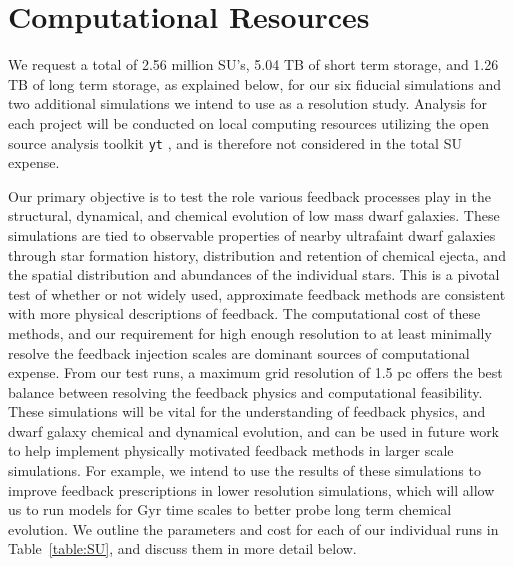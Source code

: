 \documentclass[11pt]{article}
\begin{document}
\section{Computational Resources}
We request a total of 2.56 million SU's, 5.04 TB of short term storage, and 1.26 TB of long term storage, as explained below, for our six fiducial simulations and two additional simulations we intend to use as a resolution study. Analysis for each project will be conducted on local computing resources utilizing the open source analysis toolkit \texttt{yt} \citep{yt}, and is therefore not considered in the total SU expense.

Our primary objective is to test the role various feedback processes play in the structural, dynamical, and chemical evolution of low mass dwarf galaxies. These simulations are tied to observable properties of nearby ultrafaint dwarf galaxies through star formation history, distribution and retention of chemical ejecta, and the spatial distribution and abundances of the individual stars. This is a pivotal test of whether or not widely used, approximate feedback methods are consistent with more physical descriptions of feedback. The computational cost of these methods, and our requirement for high enough resolution to at least minimally resolve the feedback injection scales are dominant sources of computational expense. From our test runs, a maximum grid resolution of 1.5 pc offers the best balance between resolving the feedback physics and computational feasibility. These simulations will be vital for the understanding of feedback physics, and dwarf galaxy chemical and dynamical evolution, and can be used in future work to help implement physically motivated feedback methods in larger scale simulations. For example, we intend to use the results of these simulations to improve feedback prescriptions in lower resolution simulations, which will allow us to run models for Gyr time scales to better probe long term chemical evolution. We outline the parameters and cost for each of our individual runs in Table~\ref{table:SU}, and discuss them in more detail below.
\end{document}
